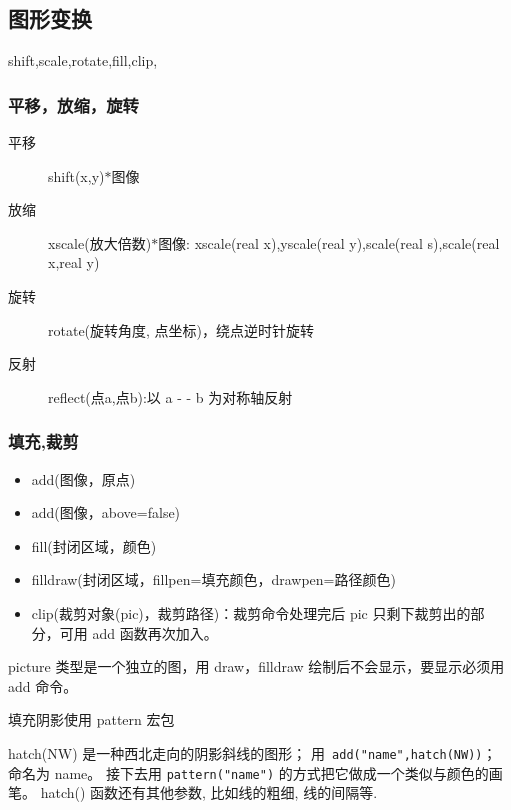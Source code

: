 \subsection{图形变换}
shift,scale,rotate,fill,clip,
\subsubsection{平移，放缩，旋转}
\begin{description}
  \item[平移] shift(x,y)$*$图像
  \item[放缩] xscale(放大倍数)$*$图像: xscale(real x),yscale(real y),scale(real s),scale(real x,real y)
  \item[旋转] rotate(旋转角度, 点坐标)，绕点逆时针旋转
  \item[反射] reflect(点a,点b):以 a - - b 为对称轴反射
\end{description}

\subsubsection{填充,裁剪}
\begin{itemize}
  \item add(图像，原点)
  \item add(图像，above=false)
  \item fill(封闭区域，颜色)
  \item filldraw(封闭区域，fillpen=填充颜色，drawpen=路径颜色)
  \item clip(裁剪对象(pic)，裁剪路径)：裁剪命令处理完后 pic 只剩下裁剪出的部分，可用 add 函数再次加入。
\end{itemize}
\textcolor[rgb]{1.00,0.00,0.50}{picture 类型是一个独立的图，用 draw，filldraw 绘制后不会显示，要显示必须用 add 命令。}


\textcolor[rgb]{0.25,0.50,0.50}{填充阴影}使用 pattern 宏包\\

\begin{minipage}{12cm}

\end{minipage}


hatch(NW) 是一种西北走向的阴影斜线的图形； 用\verb$ add("name",hatch(NW))$； 命名为 name。
接下去用 \verb$pattern("name")$ 的方式把它做成一个类似与颜色的画笔。
hatch() 函数还有其他参数, 比如线的粗细, 线的间隔等.



\clearpage
